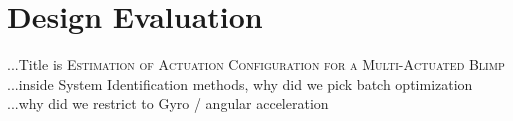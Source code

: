 \chapter{Design Evaluation}
\label{chap:design_evaluation}

...Title is \textsc{Estimation of Actuation Configuration for a Multi-Actuated Blimp}
...inside System Identification methods, why did we pick batch optimization
...why did we restrict to Gyro / angular acceleration
